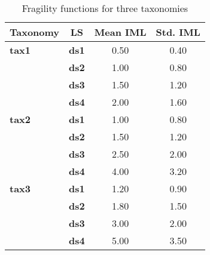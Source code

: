 \begin{table}[htbp]

\centering
\begin{tabular}{ l c c c }

\hline
\rowcolor{anti-flashwhite}
\bf{Taxonomy} & \bf{LS} & \bf{Mean IML} & \bf{Std. IML} \\
\hline
\bf{tax1} & \bf{ds1} & 0.50 & 0.40 \\
          & \bf{ds2} & 1.00 & 0.80 \\
          & \bf{ds3} & 1.50 & 1.20 \\
          & \bf{ds4} & 2.00 & 1.60 \\
\hline
\bf{tax2} & \bf{ds1} & 1.00 & 0.80 \\
          & \bf{ds2} & 1.50 & 1.20 \\
          & \bf{ds3} & 2.50 & 2.00 \\
          & \bf{ds4} & 4.00 & 3.20 \\
\hline
\bf{tax3} & \bf{ds1} & 1.20 & 0.90 \\
          & \bf{ds2} & 1.80 & 1.50 \\
          & \bf{ds3} & 3.00 & 2.00 \\
          & \bf{ds4} & 5.00 & 3.50 \\
\hline
\end{tabular}

\caption{Fragility functions for three taxonomies}
\label{tab:ff-cont-tax3-zmin}
\end{table}
